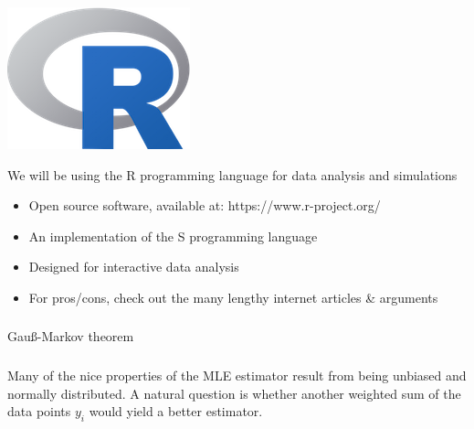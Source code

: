 \begin{frame}[fragile] \frametitle{}

\noindent
\begin{minipage}{0.5\textwidth}
\includegraphics[width=0.75\linewidth]{img/Rlogo.png}
\end{minipage}%
\begin{minipage}{0.5\textwidth}
We will be using the R programming language for data analysis and simulations \\
\begin{itemize}
\item Open source software, available at: https://www.r-project.org/
\item An implementation of the S programming language
\item Designed for interactive data analysis
\item For pros/cons, check out the many lengthy internet articles \& arguments
\end{itemize}
\end{minipage}

\end{frame}

\begin{frame}[fragile] \frametitle{}

\begin{flushright}
{\color{yaleblue}\sc\fontsize{1cm}{0cm}\selectfont Gauß-Markov theorem}
\end{flushright}

\end{frame}

\begin{frame}[fragile] \frametitle{}

Many of the nice properties of the MLE estimator result from being
unbiased and normally distributed. A natural question is whether
another weighted sum of the data points $y_i$ would yield a better
estimator.

\end{frame}

